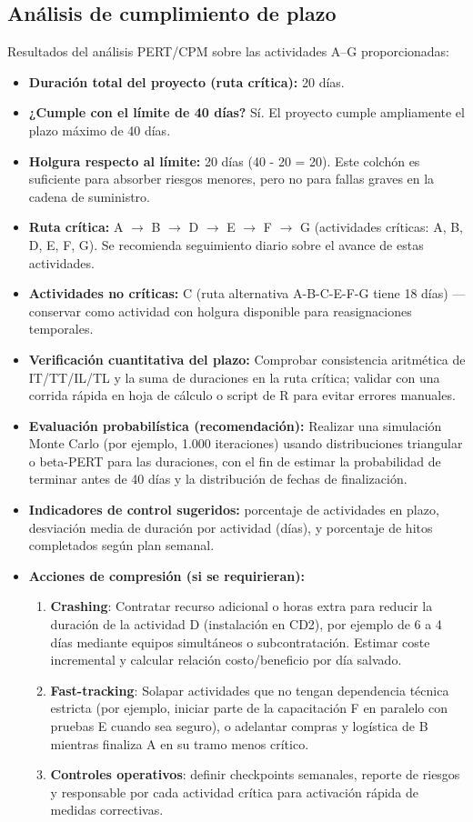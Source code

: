 \documentclass[12pt]{article}
\begin{document}
\subsection{Análisis de cumplimiento de plazo}
Resultados del análisis PERT/CPM sobre las actividades A--G proporcionadas:
\begin{itemize}
    \item \textbf{Duración total del proyecto (ruta crítica):} 20 días.
    \item \textbf{¿Cumple con el límite de 40 días?} Sí. El proyecto cumple ampliamente el plazo máximo de 40 días.
    \item \textbf{Holgura respecto al límite:} 20 días (40 - 20 = 20). Este colchón es suficiente para absorber riesgos menores, pero no para fallas graves en la cadena de suministro.
    \item \textbf{Ruta crítica:} A $\rightarrow$ B $\rightarrow$ D $\rightarrow$ E $\rightarrow$ F $\rightarrow$ G (actividades críticas: A, B, D, E, F, G). Se recomienda seguimiento diario sobre el avance de estas actividades.
    \item \textbf{Actividades no críticas:} C (ruta alternativa A-B-C-E-F-G tiene 18 días) — conservar como actividad con holgura disponible para reasignaciones temporales.
    \item \textbf{Verificación cuantitativa del plazo:} Comprobar consistencia aritmética de IT/TT/IL/TL y la suma de duraciones en la ruta crítica; validar con una corrida rápida en hoja de cálculo o script de R para evitar errores manuales.
    \item \textbf{Evaluación probabilística (recomendación):} Realizar una simulación Monte Carlo (por ejemplo, 1.000 iteraciones) usando distribuciones triangular o beta-PERT para las duraciones, con el fin de estimar la probabilidad de terminar antes de 40 días y la distribución de fechas de finalización.
    \item \textbf{Indicadores de control sugeridos:} porcentaje de actividades en plazo, desviación media de duración por actividad (días), y porcentaje de hitos completados según plan semanal.
    \item \textbf{Acciones de compresión (si se requirieran):}
    \begin{enumerate}
        \item \textbf{Crashing}: Contratar recurso adicional o horas extra para reducir la duración de la actividad D (instalación en CD2), por ejemplo de 6 a 4 días mediante equipos simultáneos o subcontratación. Estimar coste incremental y calcular relación costo/beneficio por día salvado.
        \item \textbf{Fast-tracking}: Solapar actividades que no tengan dependencia técnica estricta (por ejemplo, iniciar parte de la capacitación F en paralelo con pruebas E cuando sea seguro), o adelantar compras y logística de B mientras finaliza A en su tramo menos crítico.
        \item \textbf{Controles operativos}: definir checkpoints semanales, reporte de riesgos y responsable por cada actividad crítica para activación rápida de medidas correctivas.
    \end{enumerate}
\end{itemize}
\end{document}
